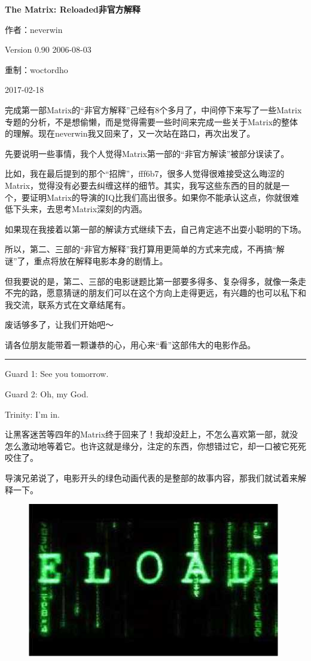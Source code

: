 \documentclass[UTF8]{ctexart}
\newcommand{\myparsep}{\noindent \rule[0.5ex]{\linewidth}{1pt}}
\newenvironment{myquote}{\color{green} \setlength{\leftskip}{6em} \setlength{\rightskip}{4em} \setlength{\parindent}{-2em}}{\par}
\begin{document}
\centerline{\bf \fontsize{15.75pt} \baselineskip \selectfont The Matrix: Reloaded非官方解释}
\vspace{12pt}
\centerline{作者：neverwin}
\centerline{Version 0.90 2006-08-03}
\centerline{重制：woctordho}
\centerline{2017-02-18}
\vspace{12pt}

完成第一部Matrix的“非官方解释”己经有8个多月了，中间停下来写了一些Matrix专题的分析，不是想偷懒，而是觉得需要一些时间来完成一些关于Matrix的整体的理解。现在neverwin我又回来了，又一次站在路口，再次出发了。

先要说明一些事情，我个人觉得Matrix第一部的“非官方解读”被部分误读了。

比如，我在最后提到的那个“招牌”，fff6b7，很多人觉得很难接受这么晦涩的Matrix，觉得没有必要去纠缠这样的细节。其实，我写这些东西的目的就是一个，要证明Matrix的导演的IQ比我们高出很多。如果你不能承认这点，你就很难低下头来，去思考Matrix深刻的内涵。

如果现在我接着以第一部的解读方式继续下去，自己肯定逃不出耍小聪明的下场。

所以，第二、三部的“非官方解释”我打算用更简单的方式来完成，不再搞“解谜”了，重点将放在解释电影本身的剧情上。

但我要说的是，第二、三部的电影谜题比第一部要多得多、复杂得多，就像一条走不完的路，愿意猜谜的朋友们可以在这个方向上走得更远，有兴趣的也可以私下和我交流，联系方式在文章结尾有。

废话够多了，让我们开始吧～

请各位朋友能带着一颗谦恭的心，用心来“看”这部伟大的电影作品。

\myparsep

\begin{myquote}
Guard 1: See you tomorrow.

Guard 2: Oh, my God.

Trinity: I'm in.
\end{myquote}

让黑客迷苦等四年的Matrix终于回来了！我却没赶上，不怎么喜欢第一部，就没怎么激动地等着它。也许这就是缘分，注定的东西，你想错过它，却一口被它死死咬住了。

导演兄弟说了，电影开头的绿色动画代表的是整部的故事内容，那我们就试着来解释一下。

\begin{figure}[htb]
\centering
\includegraphics[width=0.5\linewidth]{fig/read_reloaded-1}
\end{figure}
\end{document}
